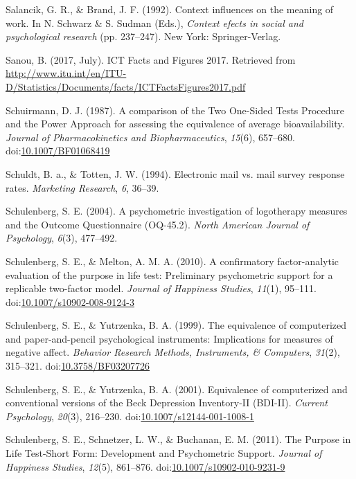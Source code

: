 \documentclass[english,man, mask]{apa6}
\theoremstyle{definition}
\theoremstyle{definition}
\theoremstyle{definition}
\theoremstyle{remark}
\begin{document}
\hypertarget{ref-Salancik1992}{}
Salancik, G. R., \& Brand, J. F. (1992). Context influences on the
meaning of work. In N. Schwarz \& S. Sudman (Eds.), \emph{Context efects
in social and psychological research} (pp. 237--247). New York:
Springer-Verlag.

\hypertarget{ref-Sanou2017}{}
Sanou, B. (2017, July). ICT Facts and Figures 2017. Retrieved from
\url{http://www.itu.int/en/ITU-D/Statistics/Documents/facts/ICTFactsFigures2017.pdf}

\hypertarget{ref-Schuirmann1987}{}
Schuirmann, D. J. (1987). A comparison of the Two One-Sided Tests
Procedure and the Power Approach for assessing the equivalence of
average bioavailability. \emph{Journal of Pharmacokinetics and
Biopharmaceutics}, \emph{15}(6), 657--680.
doi:\href{https://doi.org/10.1007/BF01068419}{10.1007/BF01068419}

\hypertarget{ref-Schuldt1994}{}
Schuldt, B. a., \& Totten, J. W. (1994). Electronic mail vs. mail survey
response rates. \emph{Marketing Research}, \emph{6}, 36--39.

\hypertarget{ref-Schulenberg2004}{}
Schulenberg, S. E. (2004). A psychometric investigation of logotherapy
measures and the Outcome Questionnaire (OQ-45.2). \emph{North American
Journal of Psychology}, \emph{6}(3), 477--492.

\hypertarget{ref-Schulenberg2010}{}
Schulenberg, S. E., \& Melton, A. M. A. (2010). A confirmatory
factor-analytic evaluation of the purpose in life test: Preliminary
psychometric support for a replicable two-factor model. \emph{Journal of
Happiness Studies}, \emph{11}(1), 95--111.
doi:\href{https://doi.org/10.1007/s10902-008-9124-3}{10.1007/s10902-008-9124-3}

\hypertarget{ref-Schulenberg1999}{}
Schulenberg, S. E., \& Yutrzenka, B. A. (1999). The equivalence of
computerized and paper-and-pencil psychological instruments:
Implications for measures of negative affect. \emph{Behavior Research
Methods, Instruments, \& Computers}, \emph{31}(2), 315--321.
doi:\href{https://doi.org/10.3758/BF03207726}{10.3758/BF03207726}

\hypertarget{ref-Schulenberg2001}{}
Schulenberg, S. E., \& Yutrzenka, B. A. (2001). Equivalence of
computerized and conventional versions of the Beck Depression
Inventory-II (BDI-II). \emph{Current Psychology}, \emph{20}(3),
216--230.
doi:\href{https://doi.org/10.1007/s12144-001-1008-1}{10.1007/s12144-001-1008-1}

\hypertarget{ref-Schulenberg2011}{}
Schulenberg, S. E., Schnetzer, L. W., \& Buchanan, E. M. (2011). The
Purpose in Life Test-Short Form: Development and Psychometric Support.
\emph{Journal of Happiness Studies}, \emph{12}(5), 861--876.
doi:\href{https://doi.org/10.1007/s10902-010-9231-9}{10.1007/s10902-010-9231-9}
\end{document}
